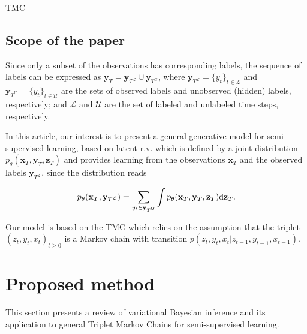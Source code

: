 \documentclass{article}
\def\x{{\mathbf x}}
\def\z{{\mathbf z}}
\def\y{{\mathbf y}}
\def\yl{{\mathbf y}_{T^{\mathcal{L}}}}
\def\yu{{\mathbf y}_{T^{\mathcal{U}}}}
\def\L{{\mathcal L}}
\def\p{p_{\theta}}
\def\L{\mathcal{L}}
\def\U{\mathcal{U}}
\begin{document}
TMC \cite{wp-cras-chaines3,pieczynski2005triplet} 
\subsection{Scope of the paper}

Since  only a subset of the observations has corresponding labels,  
the sequence of labels can be expressed as  $\y_T  = \yl \cup \yu$,  
where  $\yl = \{y_t\}_{t\in \L}$  and $\yu = \{y_t\}_{t\in \U}$ are the sets
of observed labels and unobserved (hidden) labels, respectively; and $\mathcal{L}$ and 
$\mathcal{U}$ are the set of labeled and unlabeled time steps, respectively. 



In this article, our interest is to present a general generative model for 
semi-supervised learning,  based on latent r.v. which is defined by a joint 
distribution $\p(\x_T, \y_T, \z_T)$ and provides learning from the observations 
$\x_T$ and the observed labels $\yl$,  since the distribution reads 

\begin{align}
    \label{eq:jointTMC}
    \p(\x_T, \yl) =  \sum_{y_t\in \yu} \int  \p(\x_T, \y_T,\z_T) {\rm d}\z_T \text{.}
\end{align}

Our model is based on the TMC \cite{wp-cras-chaines3,pieczynski2005triplet} which
relies on the assumption that the  triplet $(z_t, y_t, x_t)_{t \geq 0}$ 
is a Markov chain with transition $p(z_t, y_t, x_t|z_{t-1},y_{t-1},x_{t-1})$.







\section{Proposed method}
\label{sec:ourmethod}
This section presents a review of variational Bayesian inference and its
application to general Triplet Markov Chains for semi-supervised learning.
\end{document}
